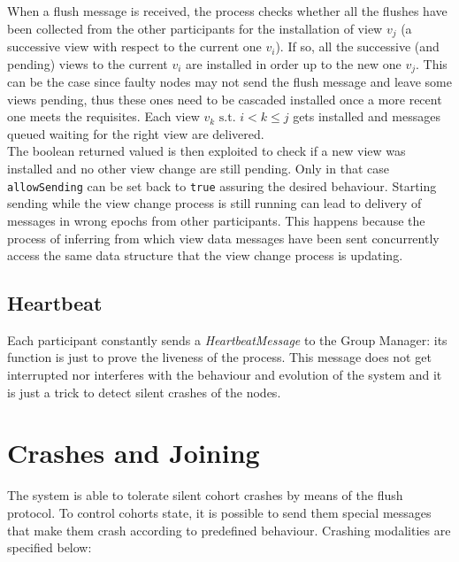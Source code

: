 \documentclass[11pt]{article}
\begin{document}
	When a flush message is received, the process checks whether all the flushes have been collected from the other participants for the installation of view $v_{j}$ (a successive view with respect to the current one $v_{i}$). If so, all the successive (and pending) views to the current $v_{i}$ are installed in order up to the new one $v_{j}$. This can be the case since faulty nodes may not send the flush message and leave some views pending, thus these ones need to be cascaded installed once a more recent one meets the requisites.\newline
	Each view $v_{k} \text{ s.t. } i < k \le j$ gets installed and messages queued waiting for the right view are delivered.\\
		
	The boolean returned valued is then exploited to check if a new view was installed and no other view change are still pending. Only in that case \texttt{allowSending} can be set back to \texttt{true} assuring the desired behaviour.
	Starting sending while the view change process is still running can lead to delivery of messages in wrong epochs from other participants. This happens because the process of inferring from which view data messages have been sent concurrently access the same data structure that the view change process is updating.
		
	\subsection{Heartbeat}
	Each participant constantly sends a \textit{HeartbeatMessage} to the Group Manager: its function is just to prove the liveness of the process. This message does not get interrupted nor interferes with the behaviour and evolution of the system and it is just a trick to detect silent crashes of the nodes.
	
	\section{Crashes and Joining}
	The system is able to tolerate silent cohort crashes by means of the flush protocol. To control cohorts state, it is possible to send them special messages that make them crash according to predefined behaviour. Crashing modalities are specified below:
	
\end{document}
